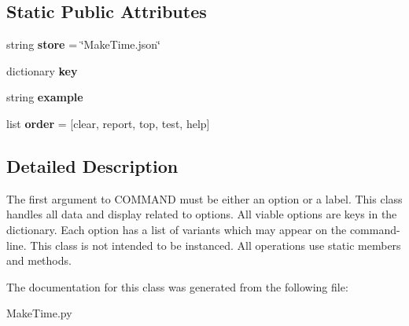 \subsection*{Static Public Attributes}
\begin{DoxyCompactItemize}
\item 
\hypertarget{classc_1_1_make_time_1_1_option_aeb22c8cafa69f0e4599c896ce54b4212}{}string {\bfseries store} = \char`\"{}Make\+Time.\+json\char`\"{}\label{classc_1_1_make_time_1_1_option_aeb22c8cafa69f0e4599c896ce54b4212}

\item 
\hypertarget{classc_1_1_make_time_1_1_option_a571699b044ea236a203ff2991b512684}{}dictionary {\bfseries key}\label{classc_1_1_make_time_1_1_option_a571699b044ea236a203ff2991b512684}

\item 
\hypertarget{classc_1_1_make_time_1_1_option_ac5e1c663e061094096622f8471736732}{}string {\bfseries example}\label{classc_1_1_make_time_1_1_option_ac5e1c663e061094096622f8471736732}

\item 
\hypertarget{classc_1_1_make_time_1_1_option_a25107ccb7b35e7df1a5e012c7ddf41de}{}list {\bfseries order} = \mbox{[}\textquotesingle{}clear\textquotesingle{}, \textquotesingle{}report\textquotesingle{}, \textquotesingle{}top\textquotesingle{}, \textquotesingle{}test\textquotesingle{}, \textquotesingle{}help\textquotesingle{}\mbox{]}\label{classc_1_1_make_time_1_1_option_a25107ccb7b35e7df1a5e012c7ddf41de}

\end{DoxyCompactItemize}


\subsection{Detailed Description}
\begin{DoxyVerb}The first argument to {COMMAND} must be either an option or a label.
This class handles all data and display related to options.
All viable options are keys in the dictionary.
Each option has a list of variants which may appear on the command-line.
This class is not intended to be instanced.
All operations use static members and methods.
\end{DoxyVerb}
 

The documentation for this class was generated from the following file\+:\begin{DoxyCompactItemize}
\item 
Make\+Time.\+py\end{DoxyCompactItemize}
